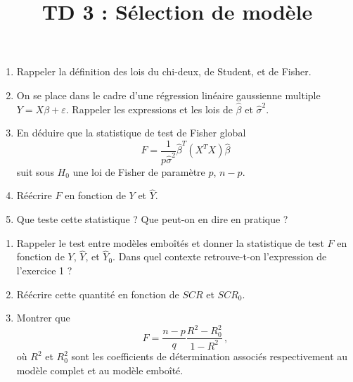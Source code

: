 \documentclass{../headers/td_upc}
\title{TD 3 : Sélection de modèle}
\providecommand{\1}{\mathds{1}}
\begin{document}
	\maketitle
	
	\begin{enumerate}
		\item Rappeler la définition des lois du chi-deux, de Student, et de Fisher.
		\item On se place dans le cadre d'une régression linéaire gaussienne multiple
		$Y = X \beta + \varepsilon$.
		Rappeler les expressions et les lois de $\hat \beta$ et $\hat{\sigma}^2$.
		\item En déduire que la statistique de test de Fisher global
		\[
		F = \dfrac{1}{p \hat \sigma^2} \hat \beta^T (X^TX) \hat \beta
		\]
		suit sous $H_0$ une loi de Fisher de paramètre $p$, $n-p$.
		\item Réécrire $F$ en fonction de $Y$ et $\hat Y$.
		\item Que teste cette statistique ? Que peut-on en dire en pratique ?
	\end{enumerate}


	
	\begin{enumerate}
		\item Rappeler le test entre modèles emboîtés et donner la statistique de test $F$
		en fonction de $Y$, $\hat Y$, et $\hat Y_0$.
		Dans quel contexte retrouve-t-on l'expression de l'exercice 1 ?
		\item Réécrire cette quantité en fonction de $SCR$ et $SCR_0$.
		\item Montrer que
		\[
		F = \dfrac{n-p}{q} \dfrac{R^2 - R_0^2}{1-R^2}\,,
		\]
		où $R^2$ et $R_0^2$ sont les coefficients de détermination associés
		respectivement au modèle complet et au modèle emboîté.
	\end{enumerate}

\end{document}

